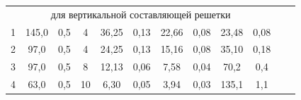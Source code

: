 \documentclass[a4paper, 12pt]{article}%
\begin{document}
\begin{enumerate}
\begin{table}[h!]
\begin{center}
\begin{tabular}{|c|c|c|c|c|c|c|c|c|c|c|c|}
\multicolumn{10}{|c|}{для вертикальной составляющей решетки}                                                                                                                                                                                                                                                                                                                                                                            &                                                    &                                                            \\ \cline{1-10}
1   & 145,0                                                     & 0,5                                                               & 4   & 36,25                                              & 0,13                                                       & 22,66                  & 0,08                         & 23,48                                               & 0,08                                                        &                                                    &                                                            \\ \cline{1-10}
2   & 97,0                                                      & 0,5                                                               & 4   & 24,25                                              & 0,13                                                       & 15,16                  & 0,08                         & 35,10                                               & 0,18                                                        &                                                    &                                                            \\ \cline{1-10}
3   & 97,0                                                      & 0,5                                                               & 8   & 12,13                                              & 0,06                                                       & 7,58                   & 0,04                         & 70,2                                                & 0,4                                                         &                                                    &                                                            \\ \cline{1-10}
4   & 63,0                                                      & 0,5                                                               & 10  & 6,30                                               & 0,05                                                       & 3,94                   & 0,03                         & 135,1                                               & 1,1                                                         &                                                    &                                                            \\ \cline{1-10}

\end{tabular}
\end{center}
\end{table}
\end{enumerate}
\end{document}
